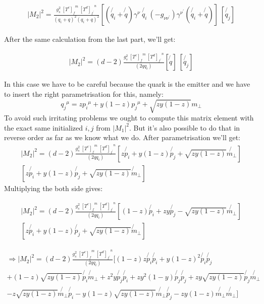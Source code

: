 \begin{equation}
\begin{split}
|M_2|^2 =\frac{g_s^2 \: {[T^c]_f}^m \: {[T^d]_{f^{\prime}}}^n }{(q_i + q)^2 (q_i + q)^2} [(\not{q_i} + \not{q}) \gamma^{\nu}  \:\not{q_i}\: (-g_{{\nu}{{\nu}^{\prime}}}) \gamma^{{\nu}^{\prime}}(\not{q_i} + \not{q})]\: 
[\not{q_j} ]
\end{split}
\end{equation}

After the same calculation from the last part, we'll get:

\begin{equation}
\begin{split}
|M_2|^2 =(d-2) \frac{g_s^2 \: {[T^c]_f}^m \: {[T^d]_{f^{\prime}}}^n }{(2qq_i)} [\not{q}]\: 
[\not{q_j} ]
\end{split}
\end{equation}

In this case we have to be careful because the quark is the emitter and we have to insert the right parametrisation for this, namely: 
\begin{equation}
	{q_j}^{\mu} = z{p_i}^{\mu} + y(1-z){p_j}^{\mu} + \sqrt{zy(1-z)}{m}_{\bot}
\end{equation}
To avoid such irritating problems we ought to compute this matrix element with the exact same initialized  $ i, j $ from $ |M_1|^2 $. But it's also possible to do that in reverse order as far as we know what we do. After parametrisation we'll get:
\begin{equation}
\begin{split}
|M_2|^2 =(d-2) \frac{g_s^2 \: {[T^c]_f}^m \: {[T^d]_{f^{\prime}}}^n }{(2qq_i)} 
[z \not{p_i}+y(1-z) \not{p_j} + \sqrt{zy(1-z)} \not{{m}_{\bot}}]\\
[z\not{p_i} + y(1-z)\not{p_j} + \sqrt{zy(1-z)}\not{m}_{\bot}]
\end{split}
\end{equation}
Multiplying the both side gives:

\begin{equation}
\begin{split}
|M_2|^2 =(d-2) \frac{g_s^2 \: {[T^c]_f}^m \: {[T^d]_{f^{\prime}}}^n }{(2qq_i)} 
[(1-z) \not{p_i}+zy \not{p_j} - \sqrt{zy(1-z)} \not{{m}_{\bot}}]\\
[z\not{p_i} + y(1-z)\not{p_j} + \sqrt{zy(1-z)}\not{m}_{\bot}]
\end{split}
\end{equation}


\begin{equation}
\begin{split}
\Longrightarrow|M_2|^2 =(d-2) \frac{g_s^2 \: {[T^c]_f}^m \: {[T^d]_{f^{\prime}}}^n }{(2qq_i)}
[(1-z)z \not{p_i}\not{p_i} + y(1-z)^2 \not{p_i}\not{p_j}\\
+(1-z)  \sqrt{zy(1-z)} \not{p_i}\not{m}_{\bot}+z^2y \not{p_j}\not{p_i} + zy^2 (1-y)\not{p_j}\not{p_j}+zy \sqrt{zy(1-z)} \not{p_j} \not{{m}_{\bot}}\\
- z\sqrt{zy(1-z)} \not{{m}_{\bot}}\not{p_i}-y(1-z) \sqrt{zy(1-z)} \not{{m}_{\bot}}\not{p_j}-zy(1-z) \not{{m}_{\bot}}\not{{m}_{\bot}}]
\end{split}
\end{equation}

